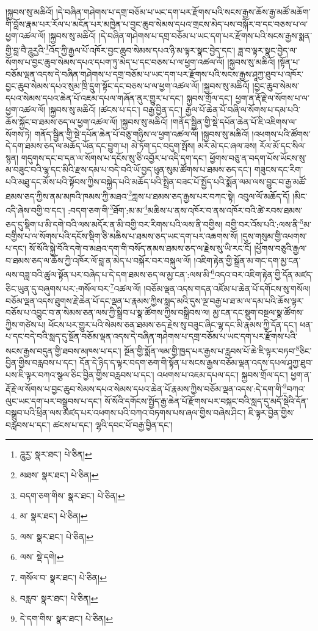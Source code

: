 །སྐྱབས་སུ་མཆིའོ། །དེ་བཞིན་གཤེགས་པ་དགྲ་བཅོམ་པ་ཡང་དག་པར་རྫོགས་པའི་སངས་རྒྱས་ཆོས་རྒྱ་མཚོ་མཆོག་གི་བློས་རྣམ་པར་རོལ་པ་མངོན་པར་མཁྱེན་པ་བྱང་ཆུབ་སེམས་དཔའ་གྲངས་མེད་པས་བསྐོར་བ་དང་བཅས་པ་ལ་ཕྱག་འཚལ་ལོ། །སྐྱབས་སུ་མཆིའོ། །དེ་བཞིན་གཤེགས་པ་དགྲ་བཅོམ་པ་ཡང་དག་པར་རྫོགས་པའི་སངས་རྒྱས་སྨན་གྱི་བླ་བཻ་ཌཱུརྱའི་\footnote{ཌཱུརྱ་  སྣར་ཐང་།  པེ་ཅིན། }འོད་ཀྱི་རྒྱལ་པོ་འཁོར་བྱང་ཆུབ་སེམས་དཔའ་ཉི་མ་ལྟར་སྣང་བྱེད་དང་། ཟླ་བ་ལྟར་སྣང་བྱེད་ལ་སོགས་པ་བྱང་ཆུབ་སེམས་དཔའ་དཔག་ཏུ་མེད་པ་དང་བཅས་པ་ལ་ཕྱག་འཚལ་ལོ། །སྐྱབས་སུ་མཆིའོ། །སྟོན་པ་བཅོམ་ལྡན་འདས་དེ་བཞིན་གཤེགས་པ་དགྲ་བཅོམ་པ་ཡང་དག་པར་རྫོགས་པའི་སངས་རྒྱས་ཤཱཀྱ་ཐུབ་པ་འཁོར་བྱང་ཆུབ་སེམས་དཔའ་སུམ་ཁྲི་དྲུག་སྟོང་དང་བཅས་པ་ལ་ཕྱག་འཚལ་ལོ། །སྐྱབས་སུ་མཆིའོ། །བྱང་ཆུབ་སེམས་དཔའ་སེམས་དཔའ་ཆེན་པོ་འཇམ་དཔལ་གཞོན་ནུར་གྱུར་པ་དང་། སྐྱབས་གྲོལ་དང་། ཕྱག་ན་རྡོ་རྗེ་ལ་སོགས་པ་ལ་ཕྱག་འཚལ་ལོ། །སྐྱབས་སུ་མཆིའོ། །ཚངས་པ་དང་། བརྒྱ་བྱིན་དང་། རྒྱལ་པོ་ཆེན་པོ་བཞི་ལ་སོགས་པ་དམ་པའི་ཆོས་སྐྱོང་བ་ཐམས་ཅད་ལ་ཕྱག་འཚལ་ལོ། །སྐྱབས་སུ་མཆིའོ། །གནོད་སྦྱིན་གྱི་སྡེ་དཔོན་ཆེན་པོ་ཇི་འཇིགས་ལ་སོགས་ཏེ། གནོད་སྦྱིན་གྱི་སྡེ་དཔོན་ཆེན་པོ་བཅུ་གཉིས་ལ་ཕྱག་འཚལ་ལོ། །སྐྱབས་སུ་མཆིའོ། །འཕགས་པའི་ཚོགས་དེ་དག་ཐམས་ཅད་ལ་མཆོད་ཡོན་དང་བྱུག་པ། མེ་ཏོག་དང་བདུག་སྤོས། མར་མེ་དང་ཞལ་ཟས། རོལ་མོ་དང་སིལ་སྙན། གདུགས་དང་བ་དན་ལ་སོགས་པ་དངོས་སུ་ཅི་འབྱོར་པ་འདི་དག་དང་། ཕྱོགས་བཅུ་ན་བདག་པོས་ཡོངས་སུ་མ་བཟུང་བའི་ལྷ་དང་མིའི་རྫས་དམ་པ་བདེ་བའི་ཡོ་བྱད་ཕུན་སུམ་ཚོགས་པ་ཐམས་ཅད་དང་། གཟུངས་དང་རིག་པའི་མཐུ་དང་མོས་པའི་སྟོབས་ཀྱིས་བསྐྱེད་པའི་མཆོད་པའི་སྤྲིན་བཟང་པོ་སྤྱོད་པའི་སྨོན་ལམ་ལས་བྱུང་བ་རྒྱ་མཚོ་ཐམས་ཅད་ཀྱིས་ནམ་མཁའི་ཁམས་ཀྱི་མཐའ་\footnote{མཐས་  སྣར་ཐང་།  པེ་ཅིན། }ཀླས་པ་ཐམས་ཅད་རྒྱས་པར་བཀང་སྟེ། འབུལ་ལོ་མཆོད་དོ། །མིང་འདི་ཞེས་བགྱི་བ་དང་། :བདག་ཅག་གི་\footnote{བདག་ཅག་གིས་  སྣར་ཐང་།  པེ་ཅིན། }ཐོག་:མ་མ་\footnote{མ་  སྣར་ཐང་།  པེ་ཅིན། }མཆིས་པ་ནས་འཁོར་བ་ནས་འཁོར་བའི་ཚེ་རབས་ཐམས་ཅད་དུ་སྡིག་པ་མི་དགེ་བའི་ལས་མདོར་ན་མི་བགྱི་བར་རིགས་པའི་ལས་ནི་བགྱིས། བགྱི་བར་འོས་པའི་:ལས་ནི་\footnote{ལས་  སྣར་ཐང་།  པེ་ཅིན། }མ་བགྱིས་པ་ལ་སོགས་པའི་དངོས་སྡིག་ཅི་མཆིས་པ་ཐམས་ཅད་ཡང་དག་པར་འཆགས་སོ། །དུས་གསུམ་གྱི་འཕགས་པ་དང་། སོ་སོའི་སྐྱེ་བོའི་དགེ་བ་མཐའ་དག་གི་བསོད་ནམས་ཐམས་ཅད་ལ་རྗེས་སུ་ཡི་རང་ངོ། །ཕྱོགས་བཅུའི་རྒྱལ་བ་ཐམས་ཅད་ལ་ཆོས་ཀྱི་འཁོར་ལོ་བླ་ན་མེད་པ་བསྐོར་བར་བསྐུལ་ལོ། །འཇིག་རྟེན་གྱི་སྒྲོན་མ་གང་དག་མྱ་ངན་ལས་བཟླ་བའི་ཚུལ་སྟོན་པར་བཞེད་པ་དེ་དག་ཐམས་ཅད་ལ་མྱ་ངན་:ལས་མི་\footnote{ལས་  སྡེ་དགེ། }འདའ་བར་འཇིག་རྟེན་གྱི་དོན་མཛད་ཅིང་ཡུན་དུ་བཞུགས་པར་:གསོལ་བར་\footnote{གསོལ་བ་  སྣར་ཐང་།  པེ་ཅིན། }འཚལ་ལོ། །བཅོམ་ལྡན་འདས་གདན་འཛོམ་པ་ཆེན་པོ་དགོངས་སུ་གསོལ། བཅོམ་ལྡན་འདས་ཐུགས་རྗེ་ཆེན་པོ་དང་ལྡན་པ་རྣམས་ཀྱིས་སླད་མའི་དུས་ལྔ་བརྒྱ་པ་ཐ་མ་ལ་དམ་པའི་ཆོས་ལྟར་བཅོས་པ་འབྱུང་བ་ན་སེམས་ཅན་ལས་ཀྱི་སྒྲིབ་པ་སྣ་ཚོགས་ཀྱིས་བསྒྲིབས་ལ། མྱ་ངན་དང་སྡུག་བསྔལ་སྣ་ཚོགས་ཀྱིས་གཙེས་པ། ཕོངས་པར་གྱུར་པའི་སེམས་ཅན་ཐམས་ཅད་རྗེས་སུ་བཟུང་ཞིང་ལྷ་དང་མི་རྣམས་ཀྱི་དོན་དང་། ཕན་པ་དང་བདེ་བའི་སླད་དུ་སྔོན་བཅོམ་ལྡན་འདས་དེ་བཞིན་གཤེགས་པ་དགྲ་བཅོམ་པ་ཡང་དག་པར་རྫོགས་པའི་སངས་རྒྱས་བདུན་གྱི་ཐབས་མཁས་པ་དང་། སྔོན་གྱི་སྨོན་ལམ་གྱི་ཁྱད་པར་རྒྱས་པ་རླབས་པོ་ཆེ་ཇི་ལྟར་བཏབ་\footnote{བརླབ་  སྣར་ཐང་།  པེ་ཅིན། }ཅིང་བྱིན་གྱིས་བརླབས་པ་དང་། དོན་དེ་ཉིད་ད་ལྟར་བདག་ཅག་གི་སྟོན་པ་སངས་རྒྱས་བཅོམ་ལྡན་འདས་དཔལ་ཤཱཀྱ་ཐུབ་པས་ཇི་ལྟར་བཀའ་སྩལ་ཅིང་བྱིན་གྱིས་བརླབས་པ་དང་། འཕགས་པ་འཇམ་དཔལ་དང་། སྐྱབས་གྲོལ་དང་། ཕྱག་ན་རྡོ་རྗེ་ལ་སོགས་པ་བྱང་ཆུབ་སེམས་དཔའ་སེམས་དཔའ་ཆེན་པོ་རྣམས་ཀྱིས་བཅོམ་ལྡན་འདས་:དེ་དག་གི་\footnote{དེ་དག་གིས་  སྣར་ཐང་།  པེ་ཅིན། }བཀའ་ལུང་ཡང་དག་པར་བསྒྲུབས་པ་དང་། སོ་སོའི་དགོངས་སྤྱོད་རྒྱ་ཆེན་པོ་རྫོགས་པར་བསྐང་བའི་སླད་དུ་མདོ་སྡེའི་དོན་བསྒྲུབ་པའི་ཕྲིན་ལས་མཛད་པར་འཕགས་པའི་བཀའ་བཏགས་པས་ཞལ་གྱིས་བཞེས་ཤིང་། ཇི་ལྟར་བྱིན་གྱིས་བརླབས་པ་དང་། ཚངས་པ་དང་། ལྷའི་དབང་པོ་བརྒྱ་བྱིན་དང་། 